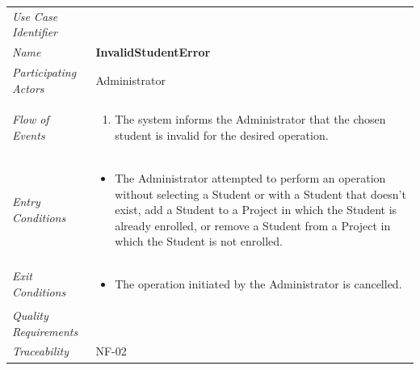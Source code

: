 \documentclass[12pt,letterpaper]{article}
\begin{document}
\begin{center}
	\begin{tabu} to 
		\toprule
		Use Case Identifier & \invalidstudenterror{} \\
		Name & {\bf InvalidStudentError} \\
		Participating Actors & Administrator \\
		Flow of Events & 
		\begin{minipage}[t]{\linewidth}
		    \begin{enumerate}
			    \item The system informs the Administrator that the chosen student is invalid for the desired operation.
			\end{enumerate}
		\end{minipage} \\

		Entry Conditions &
		\begin{minipage}[t]{\linewidth}
			\begin{itemize}
			    \item The Administrator attempted to perform an operation without selecting a Student or with a Student that doesn't exist, add a Student to a Project in which the Student is already enrolled, or remove a Student from a Project in which the Student is not enrolled.
	        \end{itemize}
		\end{minipage} \\

		Exit Conditions &
		\begin{minipage}[t]{\linewidth}
			\begin{itemize}
			    \item The operation initiated by the Administrator is cancelled.
	        \end{itemize}
		\end{minipage} \\

		Quality Requirements & \\

		Traceability & NF-02 \\
		\toprule
	\end{tabu}
\end{center}
\end{document}
